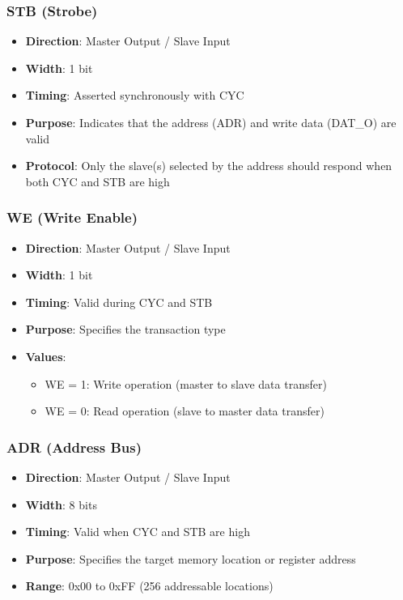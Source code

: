 \documentclass[12pt,a4paper]{article}
\begin{document}
\subsubsection{STB (Strobe)}
\begin{itemize}
    \item \textbf{Direction}: Master Output / Slave Input
    \item \textbf{Width}: 1 bit
    \item \textbf{Timing}: Asserted synchronously with CYC
    \item \textbf{Purpose}: Indicates that the address (ADR) and write data (DAT\_O) are valid
    \item \textbf{Protocol}: Only the slave(s) selected by the address should respond when both CYC and STB are high
\end{itemize}

\subsubsection{WE (Write Enable)}
\begin{itemize}
    \item \textbf{Direction}: Master Output / Slave Input
    \item \textbf{Width}: 1 bit
    \item \textbf{Timing}: Valid during CYC and STB
    \item \textbf{Purpose}: Specifies the transaction type
    \item \textbf{Values}:
    \begin{itemize}
        \item WE = 1: Write operation (master to slave data transfer)
        \item WE = 0: Read operation (slave to master data transfer)
    \end{itemize}
\end{itemize}

\subsubsection{ADR (Address Bus)}
\begin{itemize}
    \item \textbf{Direction}: Master Output / Slave Input
    \item \textbf{Width}: 8 bits
    \item \textbf{Timing}: Valid when CYC and STB are high
    \item \textbf{Purpose}: Specifies the target memory location or register address
    \item \textbf{Range}: 0x00 to 0xFF (256 addressable locations)
\end{itemize}
\end{document}
